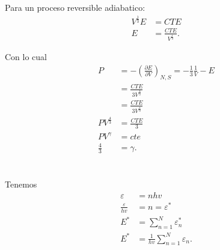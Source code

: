 \documentclass{report}
\begin{document}
Para un proceso reversible adiabatico:
\begin{align*}
  V^{\frac{1}{3}}E &= CTE \\
  E &= \frac{CTE}{V^{\frac{1}{3}}}
.\end{align*}

Con lo cual
\begin{align*}
  P &= -\left( \frac{\partial E}{\partial V}  \right)_{N, S} = -\frac{1}{3}\frac{1}{V} -E\\
  &= \frac{CTE}{3V^{\frac{4}{3}}} \\
  &= \frac{CTE}{3V^{\frac{4}{3}}} \\
  P V^{\frac{4}{3}}&= \frac{CTE}{3} \\
  PV^{\gamma} &= cte\\
  \frac{4}{3} &= \gamma
.\end{align*}


\chapter{}

\section{}

Tenemos
\begin{align*}
  \varepsilon &= nhv\\
  \frac{\varepsilon}{hv} &= n = \varepsilon^{*} \\
  E^{*}&= \sum_{n=1}^{N} \varepsilon_n^{*} \\
  E^{*}&= \frac{1}{hv}\sum_{n=1}^{N} \varepsilon_n
.\end{align*}
\end{document}
